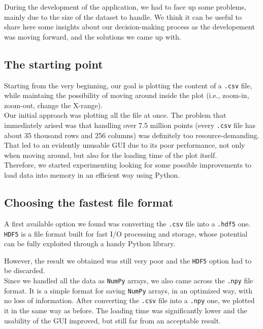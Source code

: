 \documentclass[11pt,a4paper]{article}
\begin{document}
During the development of the application, we had to face up some problems, mainly due to the size of the dataset to handle.
We think it can be useful to share here some insights about our decision-making process as the developement was moving forward, and the solutions we came up with.

\subsection{The starting point}

Starting from the very beginning, our goal is plotting the content of a \texttt{.csv} file, while maintaing the possibility of moving around inside the plot (i.e., zoom-in, zoom-out, change the X-range).\\

Our initial approach was plotting all the file at once. The problem that immediately arised was that handling over 7.5 million points (every \texttt{.csv} file has about 35 thousand rows and 256 columns) was definitely too resource-demanding. That led to an evidently unusable GUI due to its poor performance, not only when moving around, but also for the loading time of the plot itself.\\

Therefore, we started experimenting looking for some possible improvements to load data into memory in an efficient way using Python.\\

\subsection{Choosing the fastest file format}

A first available option we found was converting the \texttt{.csv} file into a \texttt{.hdf5} one. \texttt{HDF5} is a file format built for fast I/O processing and storage, whose potential can be fully exploited through a handy Python library.

However, the result we obtained was still very poor and the \texttt{HDF5} option had to be discarded.\\

Since we handled all the data as \texttt{NumPy} arrays, we also came across the \texttt{.npy} file format. It is a simple format for saving \texttt{NumPy} arrays, in an optimized way, with no loss of information.
After converting the \texttt{.csv} file into a \texttt{.npy} one, we plotted it in the same way as before. The loading time was significantly lower and the usability of the GUI improved, but still far from an acceptable result.\\
\end{document}
